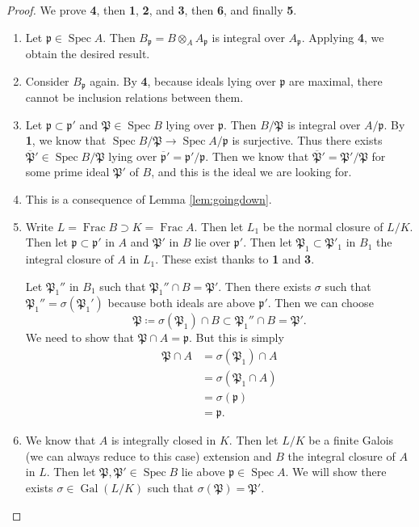 \documentclass[leqno, openany]{memoir}
\theoremstyle{definition}
\theoremstyle{remark}
\theoremstyle{plain}
\theoremstyle{definition}
\theoremstyle{remark}
\newcommand{\mf}[1]{\mathfrak{#1}}
\newcommand{\ol}[1]{\overline{#1}}
\DeclareMathOperator{\Gal}{Gal}
\DeclareMathOperator{\Spec}{Spec}
\begin{document}
\begin{proof}
    We prove \textbf{4}, then \textbf{1}, \textbf{2}, and \textbf{3}, then \textbf{6}, and finally \textbf{5}.       
    \begin{enumerate}
        \item Let $\mf{p} \in \Spec A$. Then $B_{\mf{p}} = B \otimes_A A_{\mf{p}}$ is integral over $A_{\mf{p}}$. Applying \textbf{4}, we obtain the desired result.
        \item Consider $B_{\mf{p}}$ again. By \textbf{4}, because ideals lying over $\mf{p}$ are maximal, there cannot be inclusion relations between them.
        \item Let $\mf{p} \subset \mf{p}'$ and $\mf{P} \in \Spec B$ lying over $\mf{p}$. Then $B / \mf{P}$ is integral over $A / \mf{p}$. By \textbf{1}, we know that $\Spec B/\mf{P} \to \Spec A / \mf{p}$ is surjective. Thus there exists $\ol{\mf{P}}' \in \Spec B / \mf{P}$ lying over $\ol{\mf{p}}' = \mf{p}' / \mf{p}$. Then we know that $\ol{\mf{P}}' = \mf{P}' / \mf{P}$ for some prime ideal $\mf{P}'$ of $B$, and this is the ideal we are looking for. 
        \item This is a consequence of Lemma \ref{lem:goingdown}.
        \item Write $L = \operatorname{Frac} B \supset K = \operatorname{Frac} A$. Then let $L_1$ be the normal closure of $L / K$. Then let $\mf{p} \subset \mf{p}'$ in $A$ and $\mf{P}'$ in $B$ lie over $\mf{p}'$. Then let $\mf{P}_1 \subset \mf{P}'_1$ in $B_1$ the integral closure of $A$ in $L_1$. These exist thanks to \textbf{1} and \textbf{3}.  

            Let $\mf{P}_1''$ in $B_1$ such that $\mf{P}_1'' \cap B = \mf{P}'$. Then there exists $\sigma$ such that $\mf{P}_1'' = \sigma(\mf{P}_1')$ because both ideals are above $\mf{p}'$. Then we can choose 
            \[ \mf{P} \coloneqq \sigma(\mf{P}_1) \cap B \subset \mf{P}_1'' \cap B = \mf{P}'. \]
            We need to show that $\mf{P} \cap A = \mf{p}$. But this is simply
            \begin{align*}
                \mf{P} \cap A &= \sigma(\mf{P}_1) \cap A \\
                              &= \sigma(\mf{P}_1 \cap A) \\
                              &= \sigma(\mf{p}) \\
                              &= \mf{p}.
            \end{align*}
        \item We know that $A$ is integrally closed in $K$. Then let $L/K$ be a finite Galois (we can always reduce to this case) extension and $B$ the integral closure of $A$ in $L$. Then let $\mf{P}, \mf{P}' \in \Spec B$ lie above $\mf{p} \in \Spec A$. We will show there exists $\sigma \in \Gal(L/K)$ such that $\sigma(\mf{P}) = \mf{P}'$.


\end{enumerate}
\end{proof}
\end{document}

